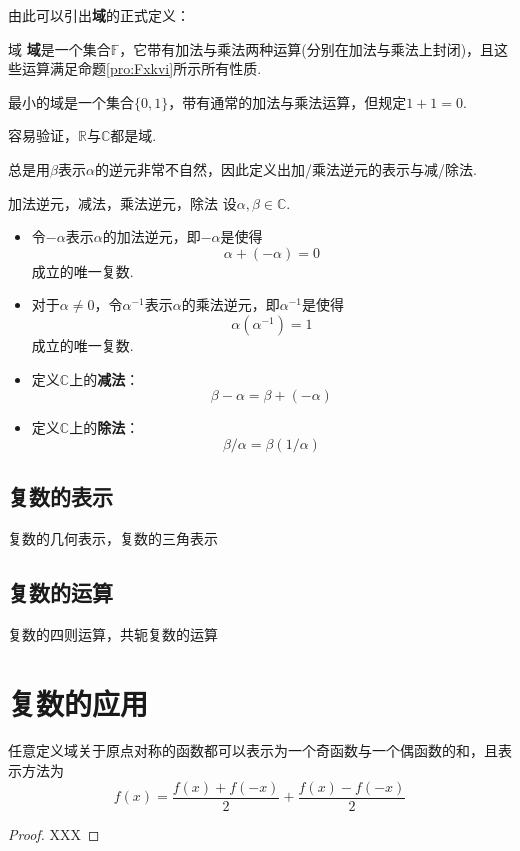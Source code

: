 \documentclass[lang=cn, zihao=5]{elegantbook}
\newcommand{\R}{\mathbb{R}}
\newcommand{\C}{\mathbb{C}}
\newcommand{\F}{\mathbb{F}}
\begin{document}
由此可以引出\textbf{域}的正式定义：

\begin{definition}{域}
	\textbf{域}是一个集合$\F$，它带有加法与乘法两种运算(分别在加法与乘法上封闭)，且这些运算满足命题\ref{pro:Fxkvi}所示所有性质.
\end{definition}
\begin{remark}
	最小的域是一个集合$\{ 0,1 \}$，带有通常的加法与乘法运算，但规定$1+1=0$.
\end{remark}

容易验证，$\R$与$\C$都是域.

总是用$\beta$表示$\alpha$的逆元非常不自然，因此定义出加/乘法逆元的表示与减/除法.

\begin{definition}{加法逆元，减法，乘法逆元，除法}
	设$\alpha , \beta \in \C $.
	\begin{itemize}
		\item 令$- \alpha$表示$\alpha$的加法逆元，即$-\alpha$是使得$$\alpha + (-\alpha) = 0$$成立的唯一复数.
		\item 对于$\alpha \neq 0$，令$\alpha ^{-1}$表示$\alpha$的乘法逆元，即$\alpha ^{-1}$是使得$$\alpha (\alpha ^{-1}) = 1$$成立的唯一复数.
		\item 定义$\C $上的\textbf{减法}：$$\beta - \alpha = \beta + (-\alpha)$$
		\item 定义$\C $上的\textbf{除法}：$$\beta / \alpha = \beta (1 / \alpha)$$
	\end{itemize}
\end{definition}

\subsection{复数的表示}

复数的几何表示，复数的三角表示

\subsection{复数的运算}

复数的四则运算，共轭复数的运算

\section{复数的应用}

\begin{lemma}
    任意定义域关于原点对称的函数都可以表示为一个奇函数与一个偶函数的和，且表示方法为$$f(x)=\frac{f(x)+f(-x)}{2}+\frac{f(x)-f(-x)}{2}$$
\end{lemma}
\begin{proof}
    XXX
\end{proof}
\end{document}
